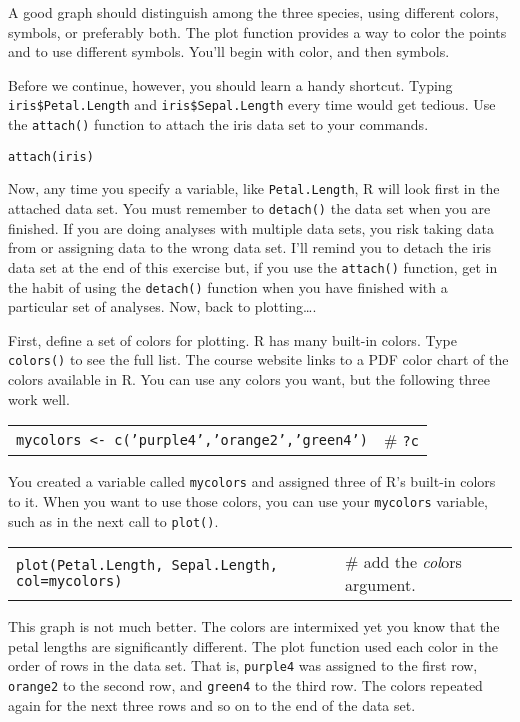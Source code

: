 \documentclass[11pt]{article}
\begin{document}
A good graph should distinguish among the three species, using different
colors, symbols, or preferably both. The plot function provides a way to
color the points and to use different symbols. You'll begin with color,
and then symbols.

Before we continue, however, you should learn a handy shortcut. Typing
\texttt{iris\$Petal.Length} and \texttt{iris\$Sepal.Length} every time would get tedious.
Use the \texttt{attach()} function to attach the iris data set to your commands.

\texttt{attach(iris)}

Now, any time you specify a variable, like \texttt{Petal.Length}, R will look
first in the attached data set. You must remember to \texttt{detach()} the data
set when you are finished. If you are doing analyses with multiple data
sets, you risk taking data from or assigning data to the wrong data set.
I'll remind you to detach the iris data set at the end of this exercise
but, if you use the \texttt{attach()} function, get in the habit of using the
\texttt{detach()} function when you have finished with a particular set of
analyses. Now, back to plotting\ldots{}.

First, define a set of colors for plotting. R has many built-in colors.
Type \texttt{colors()} to see the full list. The course website links to a PDF
color chart of the colors available in R. You can use any colors you
want, but the following three work well.

\begin{tabular}{@{}L{3.5in}L{2in}@{}}
\texttt{mycolors \textless{}- c('purple4','orange2','green4')} & \# \texttt{?c} \\
\end{tabular}

You created a variable called \texttt{mycolors} and assigned three of R's
built-in colors to it. When you want to use those colors, you can use
your \texttt{mycolors} variable, such as in the next call to \texttt{plot()}.

\begin{tabular}{@{}L{3.75in}L{2in}@{}}
\texttt{plot(Petal.Length, Sepal.Length, col=mycolors)} & \# add the \emph{col}ors
argument.\\
\end{tabular}

This graph is not much better. The colors are intermixed yet you know
that the petal lengths are significantly different. The plot function
used each color in the order of rows in the data set. That is, \texttt{purple4}
was assigned to the first row, \texttt{orange2} to the second row, and \texttt{green4} to
the third row. The colors repeated again for the next three rows and so
on to the end of the data set.
\end{document}
